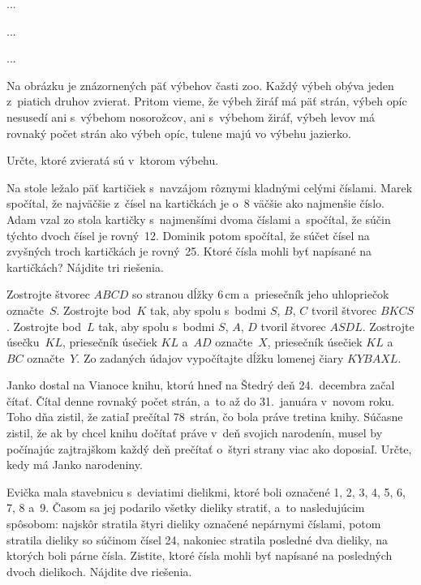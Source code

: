 {%
...}

{%
...}

{%
...}

{%
Na obrázku je znázornených päť výbehov časti zoo.
Každý výbeh obýva jeden z~piatich druhov zvierat.
Pritom vieme, že
\itemitem{$\bullet$} výbeh žiráf má päť strán,
\itemitem{$\bullet$} výbeh opíc nesusedí ani s~výbehom nosorožcov, ani s~výbehom žiráf,
\itemitem{$\bullet$} výbeh levov má rovnaký počet strán ako výbeh opíc,
\itemitem{$\bullet$} tulene majú vo výbehu jazierko.

Určte, ktoré zvieratá sú v~ktorom výbehu.
\ifobrazkyvedla\else{}\fi%
}

{%
Na stole ležalo päť kartičiek s~navzájom rôznymi kladnými celými číslami.
Marek spočítal, že najväčšie z~čísel na kartičkách je o~8 väčšie ako najmenšie číslo.
Adam vzal zo stola kartičky s~najmenšími dvoma číslami a~spočítal, že súčin týchto dvoch čísel je rovný~12.
Dominik potom spočítal, že súčet čísel na zvyšných troch kartičkách je rovný~25.
Ktoré čísla mohli byť napísané na kartičkách?
Nájdite tri riešenia.
}

{%
Zostrojte štvorec $ABCD$ so stranou dĺžky 6\,cm a~priesečník jeho uhlopriečok označte~$S$.
Zostrojte bod~$K$ tak, aby spolu s~bodmi $S$, $B$, $C$ tvoril štvorec $BKCS$.
Zostrojte bod~$L$ tak, aby spolu s~bodmi $S$, $A$, $D$ tvoril štvorec $ASDL$.
Zostrojte úsečku~$KL$, priesečník úsečiek $KL$ a~$AD$ označte~$X$, priesečník úsečiek $KL$ a~$BC$ označte~$Y$.
Zo zadaných údajov vypočítajte dĺžku lomenej čiary $KYBAXL$.}

{%
Janko dostal na Vianoce knihu, ktorú hneď na Štedrý deň 24.~decembra začal čítať. Čítal denne rovnaký počet strán, a~to až do 31.~januára v~novom roku. Toho dňa zistil, že zatiaľ prečítal 78~strán, čo bola práve tretina knihy. Súčasne zistil, že ak by chcel knihu dočítať práve v~deň svojich narodenín, musel by počínajúc zajtrajškom každý deň prečítať o~štyri strany viac ako doposiaľ. Určte, kedy má Janko narodeniny.}

{%
Evička mala stavebnicu s~deviatimi dielikmi, ktoré boli označené 1, 2, 3, 4, 5, 6, 7, 8 a~9. Časom sa jej podarilo všetky dieliky stratiť, a~to nasledujúcim spôsobom:
\itemitem{$\bullet$} najskôr stratila štyri dieliky označené nepárnymi číslami,
\itemitem{$\bullet$} potom stratila dieliky so súčinom čísel 24,
\itemitem{$\bullet$} nakoniec stratila posledné dva dieliky, na ktorých boli párne čísla.
\endgraf\noindent
Zistite, ktoré čísla mohli byť napísané na posledných dvoch dielikoch. Nájdite dve riešenia.}

